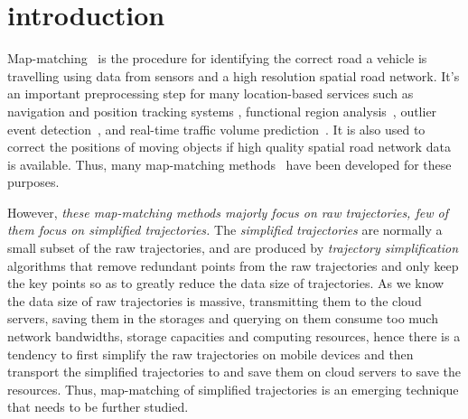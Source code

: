 

\section{introduction}
\label{sec-intro}

Map-matching~\cite{Newson2009Hidden,Wang:eddy,yin:feature-based,Hunter2013,liu:st-crf} is the procedure for identifying the correct road a vehicle is travelling using data from sensors and a high resolution spatial road network\cite{Newson2009Hidden}.
It's an important preprocessing step for many location-based services such as navigation and position tracking systems \cite{Yin:2015:Context, Yin:2015:Exploiting, Gustafsson:2002:Particle, Mohammed:2006:Fuzzy}, functional region analysis~\cite{Yuan:regions}, outlier event detection~\cite{Zhang:2012:Outlier,Chawla:2012:Anomalies}, and real-time traffic volume prediction~\cite{Jenelius:time}.
It is also used to correct the positions of moving objects if high quality spatial road network data is available\cite{Quddus2003}. Thus, many map-matching methods~\cite{Newson2009Hidden,Wang:eddy,yin:feature-based,Hunter2013,liu:st-crf} have been developed for these purposes.

However, \textit{these map-matching methods majorly focus on raw trajectories, few of them focus on {simplified trajectories}.}
The \emph{simplified trajectories} are normally a small subset of the raw trajectories, and are produced by \emph{trajectory simplification} algorithms \cite{Douglas:Peucker,Meratnia:Spatiotemporal,Muckell:SQUISH,Lin:Operb,Zhang:Evaluation,Lin:Cised} that remove
redundant points from the raw trajectories and only keep the key points so as to greatly reduce the data size of trajectories.
As we know the data size of raw trajectories is massive, %
transmitting them to the cloud servers, saving them in the storages and querying on them consume too much network bandwidths, storage capacities and computing resources,
hence there is a tendency to first simplify the raw trajectories on mobile devices and then transport the simplified trajectories to and save them on cloud servers to save the resources.
Thus, map-matching of simplified trajectories is an emerging technique that needs to be further studied.

